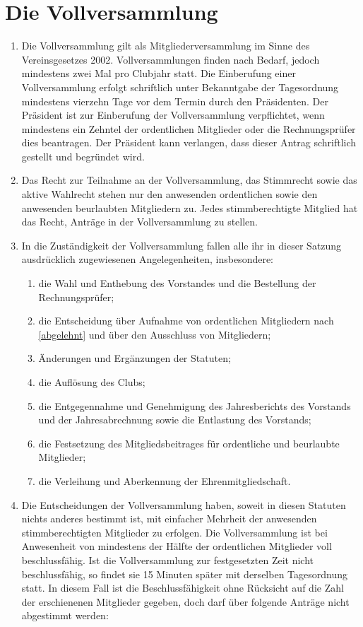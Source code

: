 \documentclass{statutclass}
\begin{document}
\section{Die Vollversammlung}
\begin{enumerate}
    \item Die Vollversammlung gilt als Mitgliederversammlung im Sinne des Vereinsgesetzes 2002. Vollversammlungen finden nach Bedarf, jedoch mindestens zwei Mal pro Clubjahr statt. Die Einberufung einer Vollversammlung erfolgt schriftlich unter Bekanntgabe der Tagesordnung mindestens vierzehn Tage vor dem Termin durch den Präsidenten. Der Präsident ist zur Einberufung der Vollversammlung verpflichtet, wenn mindestens ein Zehntel der ordentlichen Mitglieder oder die Rechnungsprüfer dies beantragen. Der Präsident kann verlangen, dass dieser Antrag schriftlich gestellt und begründet wird.
    \item Das Recht zur Teilnahme an der Vollversammlung, das Stimmrecht sowie das aktive Wahlrecht stehen nur den anwesenden ordentlichen sowie den anwesenden beurlaubten Mitgliedern zu. Jedes stimmberechtigte Mitglied hat das Recht, Anträge in der Vollversammlung zu stellen.
    \item In die Zuständigkeit der Vollversammlung fallen alle ihr in dieser Satzung ausdrücklich zugewiesenen Angelegenheiten, insbesondere:
    \begin{enumerate}
        \item die Wahl und Enthebung des Vorstandes und die Bestellung der Rechnungsprüfer;
        \item die Entscheidung über Aufnahme von ordentlichen Mitgliedern nach \ref{abgelehnt} und über den Ausschluss von Mitgliedern;
        \item Änderungen und Ergänzungen der Statuten;
        \item die Auflösung des Clubs;
        \item die Entgegennahme und Genehmigung des Jahresberichts des Vorstands und der Jahresabrechnung sowie die Entlastung des Vorstands;
        \item die Festsetzung des Mitgliedsbeitrages für ordentliche und beurlaubte Mitglieder;
        \item die Verleihung und Aberkennung der Ehrenmitgliedschaft.
    \end{enumerate}
    \item\label{mehrheiten} Die Entscheidungen der Vollversammlung haben, soweit in diesen Statuten nichts anderes bestimmt ist, mit einfacher Mehrheit der anwesenden stimmberechtigten Mitglieder zu erfolgen. Die Vollversammlung ist bei Anwesenheit von mindestens der Hälfte der ordentlichen Mitglieder voll beschlussfähig. Ist die Vollversammlung zur festgesetzten Zeit nicht beschlussfähig, so findet sie 15 Minuten später mit derselben Tagesordnung statt. In diesem Fall ist die Beschlussfähigkeit ohne Rücksicht auf die Zahl der erschienenen Mitglieder gegeben, doch darf über folgende Anträge nicht abgestimmt werden:

\end{enumerate}
\end{document}
